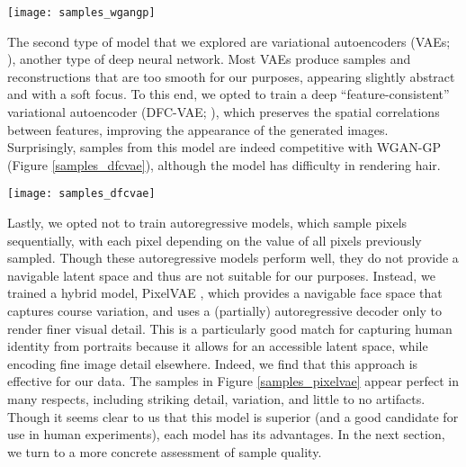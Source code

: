 \documentclass[10pt,letterpaper]{article}
\begin{document}
\begin{figure*}[!h]
  \begin{center}
    \texttt{[image: samples\_wgangp]}
  \vspace{-6mm}
  \caption{Samples from WGAN-GP trained on human\ae.}
  \label{samples_wgangp}
  \end{center}
\end{figure*}

The second type of model that we explored are variational autoencoders (VAEs; \citealp{kingma2013auto}), another type of deep neural network. Most VAEs produce samples and reconstructions that are too smooth for our purposes, appearing slightly abstract and with a soft focus. To this end, we opted to train a deep ``feature-consistent'' variational autoencoder (DFC-VAE; \citealp{hou2017deep}), which preserves the spatial correlations between features, improving the appearance of the generated images. Surprisingly, samples from this model are indeed competitive with WGAN-GP (Figure \ref{samples_dfcvae}), although the model has difficulty in rendering hair.

\begin{figure*}[!h]
  \begin{center}
    \texttt{[image: samples\_dfcvae]}
  \vspace{-6mm}
  \caption{Samples from DFC-VAE trained on human\ae.}
  \label{samples_dfcvae}
  \end{center}
\end{figure*}

Lastly, we opted not to train autoregressive models, which sample pixels sequentially, with each pixel depending on the value of all pixels previously sampled. Though these autoregressive models perform well, they do not provide a navigable latent space and thus are not suitable for our purposes. Instead, we trained a hybrid model, PixelVAE \citep{gulrajani2016pixelvae}, which provides a navigable face space that captures course variation, and uses a (partially) autoregressive decoder only to render finer visual detail. This is a particularly good match for capturing human identity from portraits because it allows for an accessible latent space, while encoding fine image detail elsewhere. Indeed, we find that this approach is effective for our data. The samples in Figure \ref{samples_pixelvae} appear perfect in many respects, including striking detail, variation, and little to no artifacts. Though it seems clear to us that this model is superior (and a good candidate for use in human experiments), each model has its advantages. In the next section, we turn to a more concrete assessment of sample quality.
\end{document}
